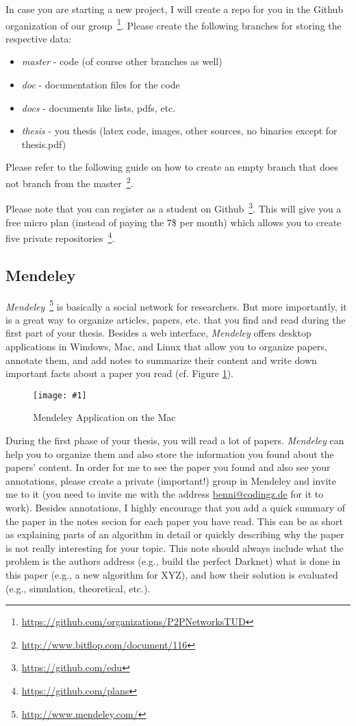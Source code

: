 \documentclass{article}
\newcommand{\img}[4]{
	\begin{figure}[!htb]
		\centering
		\texttt{[image: \#1]}
		\caption{#3}
		\label{#2}
	\end{figure}
}
\begin{document}
In case you are starting a new project, I will create a repo for you in the Github organization of our group~\footnote{\url{https://github.com/organizations/P2PNetworksTUD}}.
Please create the following branches for storing the respective data:
\begin{itemize}
	\item \emph{master} - code (of course other branches as well)
	\item \emph{doc} - documentation files for the code
	\item \emph{docs} - documents like lists, pdfs, etc.
	\item \emph{thesis} - you thesis (latex code, images, other sources, no binaries except for thesis.pdf)
\end{itemize}
Please refer to the following guide on how to create an empty branch that does not branch from the master~\footnote{\url{http://www.bitflop.com/document/116}}.

Please note that you can register as a student on Github~\footnote{\url{https://github.com/edu}}.
This will give you a free micro plan (instead of paying the 7\$ per month) which allows you to create five private repositories~\footnote{\url{https://github.com/plans}}.




\subsection{Mendeley}

\emph{Mendeley}~\footnote{\url{http://www.mendeley.com/}} is basically a social network for researchers.
But more importantly, it is a great way to organize articles, papers, etc. that you find and read during the first part of your thesis.
Besides a web interface, \emph{Mendeley} offers desktop applications in Windows, Mac, and Linux that allow you to organize papers, annotate them, and add notes to summarize their content and write down important facts about a paper you read (cf. Figure \ref{fig:mendeley}).

\img{mendeley}{fig:mendeley}{Mendeley Application on the Mac}{0.6}

During the first phase of your thesis, you will read a lot of papers.
\emph{Mendeley} can help you to organize them and also store the information you found about the papers' content.
In order for me to see the paper you found and also see your annotations, please create a private (important!) group in Mendeley and invite me to it (you need to invite me with the address \url{benni@codingz.de} for it to work).
Besides annotations, I highly encourage that you add a quick summary of the paper in the notes secion for each paper you have read.
This can be as short as explaining parts of an algorithm in detail or quickly describing why the paper is not really interesting for your topic.
This note should always include what the problem is the authors address (e.g., build the perfect Darknet) what is done in this paper (e.g., a new algorithm for XYZ), and how their solution is evaluated (e.g., simulation, theoretical, etc.).
\end{document}

